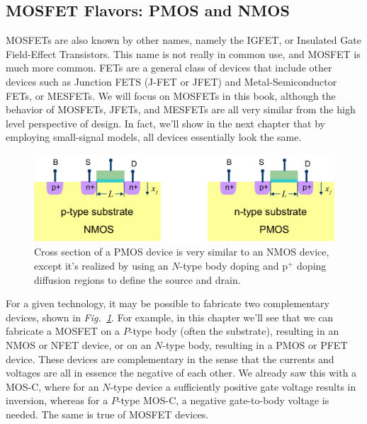 \subsection{MOSFET Flavors:  PMOS and NMOS}
MOSFETs are also known by other names, namely the IGFET, or Insulated Gate Field-Effect Transistors.  This name is not really in common use, and MOSFET is much more common.  FETs are a general class of devices that include other devices such as Junction FETS (J-FET or JFET) and Metal-Semiconductor FETs, or MESFETs.  We will focus on MOSFETs in this book, although the behavior of MOSFETs, JFETs, and MESFETs are all very similar from the high level perspective of design.  In fact, we'll show in the next chapter that by employing small-signal models, all devices essentially look the same.
\begin{figure}[tb]
\centering
\includegraphics[width=.75\columnwidth]{pmos_xsect}
\caption{Cross section of a PMOS device is very similar to an NMOS device, except it's realized by using an $N$-type body doping and p$^+$ doping diffusion regions to define the source and drain.} \label{fig:pmos_xsect}
\end{figure}
For a given technology, it may be possible to fabricate two complementary devices, shown in \emph{Fig.~\ref{fig:pmos_xsect}}.  For example, in this chapter we'll see that we can fabricate a MOSFET on a $P$-type body (often the substrate), resulting in an NMOS or NFET device, or on an $N$-type body, resulting in a PMOS or PFET device.  These devices are complementary in the sense that the currents and voltages are all in essence the negative of each other.  We already saw this with a MOS-C, where for an $N$-type device a sufficiently positive gate voltage results in inversion, whereas for a $P$-type MOS-C, a negative gate-to-body voltage is needed. The same is true of MOSFET devices.
